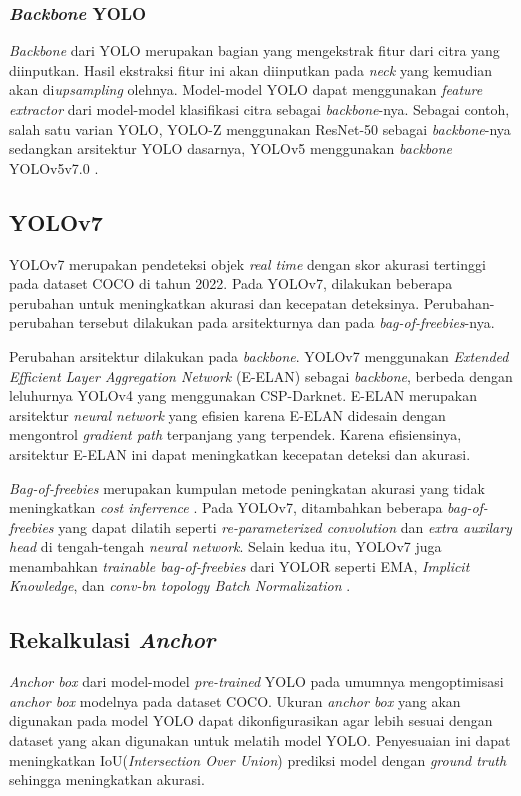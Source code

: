   \subsubsection{\emph{Backbone} YOLO}
    \emph{Backbone} dari YOLO merupakan bagian yang mengekstrak fitur dari citra yang diinputkan.
    Hasil ekstraksi fitur ini akan diinputkan pada \emph{neck} yang kemudian akan di\emph{upsampling} olehnya.
    Model-model YOLO dapat menggunakan \emph{feature extractor} dari model-model klasifikasi citra sebagai \emph{backbone}-nya.
    Sebagai contoh, salah satu varian YOLO, YOLO-Z menggunakan ResNet-50 sebagai \emph{backbone}-nya sedangkan arsitektur YOLO dasarnya, YOLOv5 menggunakan \emph{backbone} YOLOv5v7.0 \parencite{yoloz}.




\subsection{YOLOv7}
  YOLOv7 merupakan pendeteksi objek \emph{real time} dengan skor akurasi tertinggi pada dataset COCO di tahun 2022.
  Pada YOLOv7, dilakukan beberapa perubahan untuk meningkatkan akurasi dan kecepatan deteksinya.
  Perubahan-perubahan tersebut dilakukan pada arsitekturnya dan pada \emph{bag-of-freebies}-nya.

  Perubahan arsitektur dilakukan pada \emph{backbone}. YOLOv7 menggunakan \emph{Extended Efficient Layer Aggregation Network} (E-ELAN) sebagai \emph{backbone}, berbeda dengan leluhurnya YOLOv4 yang menggunakan CSP-Darknet.
  E-ELAN merupakan arsitektur \emph{neural network} yang efisien karena E-ELAN didesain dengan mengontrol \emph{gradient path} terpanjang yang terpendek.
  Karena efisiensinya, arsitektur E-ELAN ini dapat meningkatkan kecepatan deteksi dan akurasi. \parencite{yolov7}

  \emph{Bag-of-freebies} merupakan kumpulan metode peningkatan akurasi yang tidak meningkatkan \emph{cost inferrence} \parencite{yolov4}. 
  Pada YOLOv7, ditambahkan beberapa \emph{bag-of-freebies} yang dapat dilatih seperti \emph{re-parameterized convolution} dan \emph{extra auxilary head} di tengah-tengah \emph{neural network}.
  Selain kedua itu, YOLOv7 juga menambahkan \emph{trainable bag-of-freebies} dari YOLOR seperti EMA, \emph{Implicit Knowledge}, dan \emph{conv-bn topology Batch Normalization} \parencite{yolov7}.


\subsection{Rekalkulasi \emph{Anchor}}
  \emph{Anchor box} dari model-model \emph{pre-trained} YOLO pada umumnya mengoptimisasi \emph{anchor box} modelnya pada dataset COCO.
  Ukuran \emph{anchor box} yang akan digunakan pada model YOLO dapat dikonfigurasikan agar lebih sesuai dengan dataset yang akan digunakan untuk melatih model YOLO.
  Penyesuaian ini dapat meningkatkan IoU(\emph{Intersection Over Union}) prediksi model dengan \emph{ground truth} sehingga meningkatkan akurasi.

